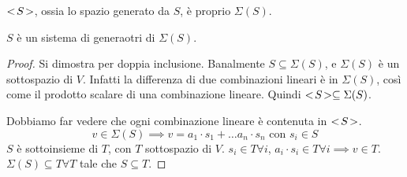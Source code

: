 \begin{prop}
$<\!{S}\!>$, ossia lo spazio generato da $S$, \`e proprio $\Sigma(S)$.

$S$ \`e un sistema di generaotri di $\Sigma(S)$.
\end{prop}
\begin{proof}
Si dimostra per doppia inclusione. Banalmente $S \subseteq \Sigma(S)$, e $\Sigma(S)$ \`e un sottospazio di $V$. Infatti la differenza di due combinazioni lineari \`e in $\Sigma (S)$, cos\`i come il prodotto scalare di una combinazione lineare. Quindi $<\!{S}\!> \subseteq \Sigma (S)$.

Dobbiamo far vedere che ogni combinazione lineare \`e contenuta in $<\!{S}\!>$.
\[
v \in \Sigma(S) \implies v = a_1 \cdot s_1 + \dots a_n \cdot s_n \text{ con } s_i \in S
\]
$S$ \`e sottoinsieme di $T$, con $T$ sottospazio di $V$. $s_i \in T \forall i$, $a_i \cdot s_i \in T \forall i \implies v \in T$. $\Sigma(S) \subseteq T \forall T$ tale che $S \subseteq T$.
\end{proof}


